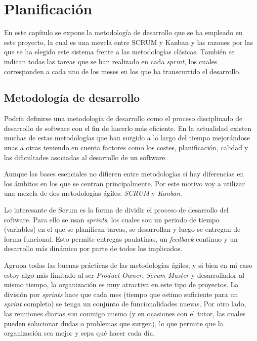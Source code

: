 \chapter{Planificación}

En este capítulo se expone la metodología de desarrollo que se ha empleado en este proyecto, la cual es una mezcla entre SCRUM y Kanban y las razones por las que se ha elegido este sistema frente a las metodologías clásicas. También se indican todas las tareas que se han realizado en cada \textit{sprint}, los cuales corresponden a cada uno de los meses en los que ha transcurrido el desarrollo.

\section{Metodología de desarrollo}

Podría definirse una metodología de desarrollo como el proceso disciplinado de desarrollo de software con el fin de hacerlo más eficiente. En la actualidad existen muchas de estas metodologías que han surgido a lo largo del tiempo mejorándose unas a otras teniendo en cuenta factores como los costes, planificación, calidad y las dificultades asociadas al desarrollo de un software.

Aunque las bases esenciales no difieren entre metodologías sí hay diferencias en los ámbitos en los que se centran principalmente. Por este motivo voy a utilizar una mezcla de dos metodologías ágiles: \textit{SCRUM} y \textit{Kanban}.

Lo interesante de Scrum es la forma de dividir el proceso de desarrollo del software. Para ello se usan \textit{sprints}, los cuales son un periodo de tiempo (variables) en el que se planifican tareas, se desarrollan y luego se entregan de forma funcional. Esto permite entregas paulatinas, un \textit{feedback} continuo y un desarrollo más dinámico por parte de todos los implicados.

Agrupa todas las buenas prácticas de las metodologías ágiles, y si bien en mi caso estoy algo más limitado al ser \textit{Product Owner}, \textit{Scrum Master} y desarrollador al mismo tiempo, la organización es muy atractiva en este tipo de proyectos. La división por \textit{sprints} hace que cada mes (tiempo que estimo suficiente para un \textit{sprint} completo) se tenga un conjunto de funcionalidades nuevas. Por otro lado, las reuniones diarias son conmigo mismo (y en ocasiones con el tutor, las cuales pueden solucionar dudas o problemas que surgen), lo que permite que la organización sea mejor y sepa qué hacer cada día.

